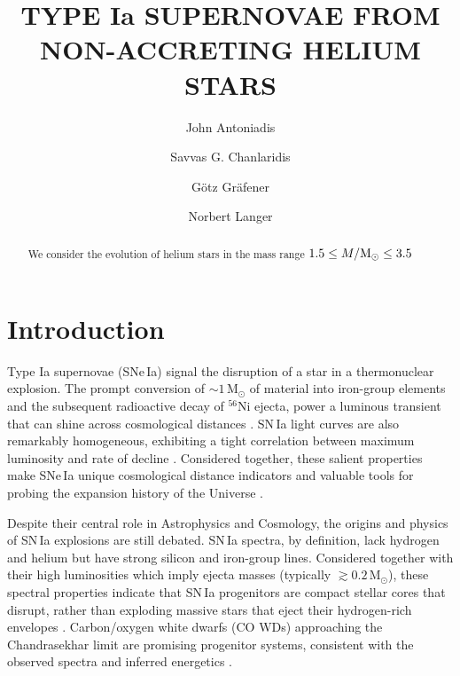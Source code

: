 \documentclass[twocolumn,tighten,times]{aastex62}
\newcommand{\ia}{SN\,Ia\xspace}
\newcommand{\ias}{SNe\,Ia\xspace}
\begin{document}
\title{TYPE Ia SUPERNOVAE FROM NON-ACCRETING HELIUM STARS}



\author[0000-0002-0786-7307]{John Antoniadis}


\author{Savvas G. Chanlaridis}
\author{G\"{o}tz Gr\"{a}fener}
\author{Norbert Langer}

\begin{abstract}
  We consider the evolution of helium stars in the mass range $1.5 \leq M/{\rm M}_{\odot}\leq 3.5$
\end{abstract}




\section{Introduction} \label{sec:intro}
Type Ia supernovae (\ias{}) signal the  disruption of a star 
in a thermonuclear explosion. The prompt conversion of $\sim 1$\,M$_{\odot}$ of  
material into iron-group elements and the subsequent radioactive decay of $^{56}$Ni
ejecta, power a luminous transient that can shine across 
cosmological distances \citep[e.g.][]{Arnett:1982}. \ia light curves are 
also remarkably homogeneous, exhibiting a tight correlation between maximum luminosity and 
rate of decline \citep{Phillips:1993ng}. Considered together, these  salient properties make \ias 
unique cosmological distance indicators and valuable tools for probing the expansion history of the Universe \citep{Riess:1998cb,Perlmutter:1998np}. 

 Despite their central role in Astrophysics and Cosmology, 
 the origins and physics of \ia{} explosions are still debated. 
 \ia spectra, by definition, lack hydrogen and helium but have strong silicon and iron-group lines. 
 Considered together with their high luminosities which imply 
 ejecta masses (typically $\gtrsim 0.2$\,M$_{\odot}$), 
these spectral properties indicate  that \ia progenitors are 
 compact stellar cores that disrupt, rather than exploding 
 massive stars that eject their hydrogen-rich envelopes
 \citep[][and references therein]{Maoz:2013hna}. 
 Carbon/oxygen white dwarfs (CO WDs) approaching the Chandrasekhar limit 
 are promising progenitor systems, consistent with the observed 
 spectra and inferred energetics \citep{Arnett:1969,Wang:2012za,Maoz:2013hna}.
 
\end{document}
